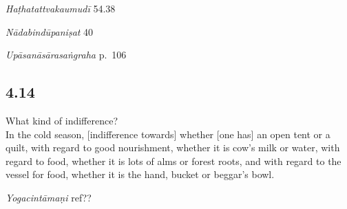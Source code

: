 \begin{ekdosis}
\begin{testimonia}[hp04_013]
\emph{Haṭhatattvakaumudī} 54.38
\begin{versinnote}
\end{versinnote}

\emph{Nādabindūpaniṣat} 40
\begin{versinnote}
\end{versinnote}

\emph{Upāsanāsārasaṅgraha} p.~106
\begin{versinnote}
\end{versinnote}
\end{testimonia}


\subsection*{4.14}
\begin{translation}[hp04_014]
What kind of indifference?\\
In the cold season, [indifference towards] whether [one has] an open tent or a quilt, with regard to good nourishment, whether it is cow's milk or water, with regard to food, whether it is lots of alms or forest roots, and with regard to the vessel for food, whether it is the hand, bucket or beggar's bowl.
\end{translation}


\begin{testimonia}[hp04_014]
\emph{Yogacintāmaṇi} ref??
\begin{versinnote}
\end{versinnote}


\end{testimonia}
\end{ekdosis}
